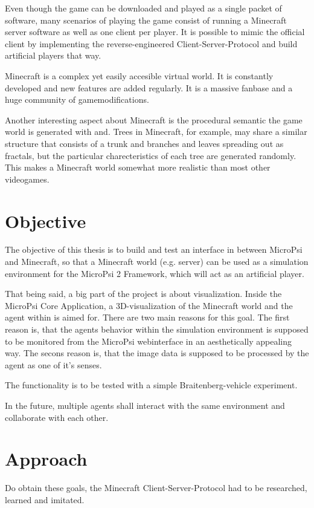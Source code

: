 Even though the game can be downloaded and played as a single packet of software, many scenarios of playing the game consist of running a Minecraft server software as well as one client per player. It is possible to mimic the official client by implementing the reverse-engineered Client-Server-Protocol and build artificial players that way.

Minecraft is a complex yet easily accesible virtual world. It is constantly developed and new features are added regularly. It is a massive fanbase and a huge community of gamemodifications.

Another interesting aspect about Minecraft is the procedural semantic the game world is generated with and. Trees in Minecraft, for example, may share a similar structure that consists of a trunk and branches and leaves spreading out as fractals, but the particular charecteristics of each tree are generated randomly. This makes a Minecraft world somewhat more realistic than most other videogames.

\section{Objective}
The objective of this thesis is to build and test an interface in between MicroPsi and Minecraft, so that a Minecraft world (e.g. server) can be used as a simulation environment for the MicroPsi 2 Framework, which will act as an artificial player.

That being said, a big part of the project is about visualization. Inside the MicroPsi Core Application, a 3D-visualization of the Minecraft world and the agent within is aimed for. There are two main reasons for this goal. The first reason is, that the agents behavior within the simulation environment is supposed to be monitored from the MicroPsi webinterface in an aesthetically appealing way. The secons reason is, that the image data is supposed to be processed by the agent as one of it's senses.

The functionality is to be tested with a simple Braitenberg-vehicle experiment.

In the future, multiple agents shall interact with the same environment and collaborate with each other.

\section{Approach}
Do obtain these goals, the Minecraft Client-Server-Protocol had to be researched, learned and imitated.

